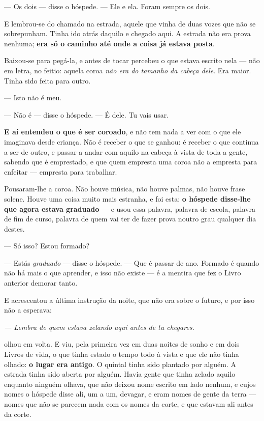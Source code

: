 \documentclass[livro.tex]{subfiles}
\begin{document}
--- Os dois --- disse o hóspede. --- Ele e ela. Foram sempre os dois.

\medskip
\noindent E \Ben lembrou-se do chamado na estrada, aquele que vinha de duas
vozes que não se sobrepunham. Tinha ido atrás daquilo e chegado aqui. A estrada
não era prova nenhuma; \textbf{era só o caminho até onde a coisa já estava
posta}.

\medskip
\noindent Baixou-se para pegá-la, e antes de tocar percebeu o que estava
escrito nela --- não em letra, no feitio: aquela coroa \emph{não era do
tamanho da cabeça dele}. Era maior. Tinha sido feita para outro.

\medskip
\noindent --- Isto não é meu.

--- Não é --- disse o hóspede. --- É dele. Tu vais usar.

\medskip
\noindent \textbf{E aí \Ben entendeu o que é ser coroado}, e não tem nada a
ver com o que ele imaginava desde criança. Não é receber o que se ganhou: é
receber o que continua a ser de outro, e passar a andar com aquilo na cabeça à
vista de toda a gente, sabendo que é emprestado, e que quem empresta uma coroa
não a empresta para enfeitar --- empresta para trabalhar.

\medskip
\noindent Pousaram-lhe a coroa. Não houve música, não houve palmas, não houve
frase solene. Houve uma coisa muito mais estranha, e foi esta: \textbf{o
hóspede disse-lhe que agora estava graduado} --- e usou essa palavra, palavra
de escola, palavra de fim de curso, palavra de quem vai ter de fazer prova
noutro grau qualquer dia destes.

\medskip
\noindent --- Só isso? Estou formado?

--- Estás \emph{graduado} --- disse o hóspede. --- Que é passar de ano. Formado
é quando não há mais o que aprender, e isso não existe --- é a mentira que fez
o Livro anterior demorar tanto.

\medskip
\noindent E acrescentou a última instrução da noite, que não era sobre o
futuro, e por isso \Ben não a esperava:

\begin{center}
\emph{--- Lembra de quem estava zelando aqui antes de tu chegares.}
\end{center}

\medskip
\noindent \Ben olhou em volta. E viu, pela primeira vez em duas noites de
sonho e em dois Livros de vida, o que tinha estado o tempo todo à vista e que
ele não tinha olhado: \textbf{o lugar era antigo}. O quintal tinha sido
plantado por alguém. A estrada tinha sido aberta por alguém. Havia gente que
tinha zelado aquilo enquanto ninguém olhava, que não deixou nome escrito em
lado nenhum, e cujos nomes o hóspede disse ali, um a um, devagar, e eram nomes
de gente da terra --- nomes que não se parecem nada com os nomes da corte, e
que estavam ali antes da corte.
\end{document}
